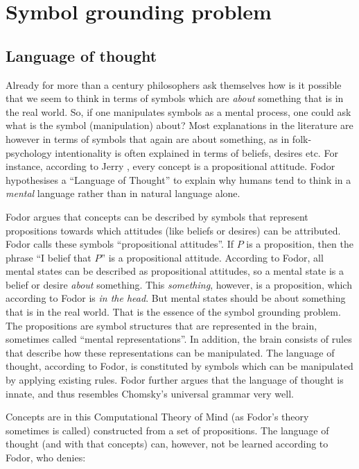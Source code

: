 \section{Symbol grounding problem}

\subsection{Language of thought}

Already for more than a century philosophers ask themselves how is it possible that we seem to think in terms of symbols which are {\em about} something that is in the real world. So, if one manipulates symbols as a mental process, one could ask what is the symbol (manipulation) about? Most explanations in the literature are however in terms of symbols that again are about something, as in folk-psychology intentionality is often explained in terms of beliefs, desires etc. For instance, according to Jerry \citet{fodor:1975}, every concept is a propositional attitude. Fodor hypothesises a ``Language of Thought'' to explain why humans tend to think in a {\em mental} language rather than in natural language alone.

Fodor argues that concepts can be described by symbols that represent propositions towards which attitudes (like beliefs or desires) can be attributed. Fodor calls these symbols ``propositional attitudes''. If $P$ is a proposition, then the phrase ``I belief that $P$'' is a propositional attitude. According to Fodor, all mental states can be described as propositional attitudes, so a mental state is a belief or desire {\em about} something. This {\em something}, however, is a proposition, which according to Fodor is {\em in the head}. But mental states should be about something that is in the real world. That is the essence of the symbol grounding problem. The propositions are symbol structures that are represented in the brain, sometimes called ``mental representations''. In addition, the brain consists of rules that describe how these representations can be manipulated. The language of thought, according to Fodor, is constituted by symbols which can be manipulated by applying existing rules. Fodor further argues that the language of thought is innate, and thus resembles Chomsky's universal grammar very well.

Concepts are in this Computational Theory of Mind (as Fodor's theory sometimes is called) constructed from a set of propositions. The language of thought (and with that concepts) can, however, not be learned according to Fodor, who denies:

